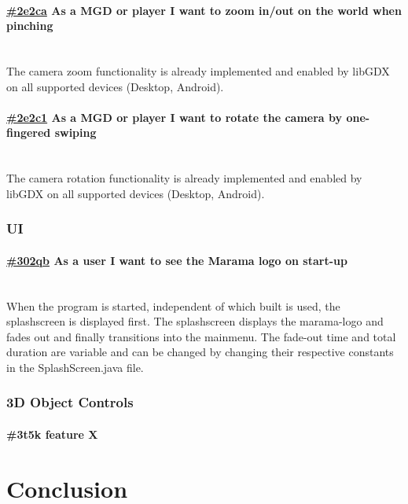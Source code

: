 \documentclass[10pt]{extarticle} %
\begin{document}
    \paragraph{\href{https://app.clickup.com/757520/761304/t/2e2ca}{\#2e2ca} As a MGD or player I want to zoom in/out on the world when pinching}\mbox{}\\
    The camera zoom functionality is already implemented and enabled by libGDX on all supported devices (Desktop, Android).
    \paragraph{\href{https://app.clickup.com/757520/761304/t/2e2c1}{\#2e2c1} As a MGD or player I want to rotate the camera by one-fingered swiping}\mbox{}\\
    The camera rotation functionality is already implemented and enabled by libGDX on all supported devices (Desktop, Android).

    \subsubsection{UI}
    \paragraph{\href{https://app.clickup.com/757520/761304/t/302qb}{\#302qb} As a user I want to see the Marama logo on start-up}\mbox{}\\
    When the program is started, independent of which built is used, the splashscreen is displayed first.
    The splashscreen displays the marama-logo and fades out and finally transitions into the mainmenu.
    The fade-out time and total duration are variable and can be changed by changing their respective constants in the SplashScreen.java file.

    \subsubsection{3D Object Controls}
    \paragraph{\#3t5k feature X}

    \newpage

    \section {Conclusion}

    \newpage

    
\end{document}
